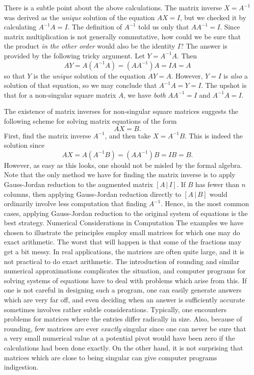 There is a subtle point about the above calculations.   The
matrix inverse  $X = A^{-1}$ was derived as the {\it unique\/}
solution of the equation $AX = I$, but we checked it by calculating
$A^{-1}A = I$.   The definition of $A^{-1}$ told us only that
$AA^{-1} = I$.   Since matrix multiplication is not generally
commutative, how could we be sure that the product {\it in the
other order\/} would also be the identity $I$?  The answer is
provided by the following tricky argument.   Let $Y = A^{-1}A$.
Then
$$
   AY = A(A^{-1}A) = (AA^{-1})A = IA = A
$$
so that $Y$ is the {\it unique\/} solution of the equation
$AY = A$.  However, $Y=I$ is {\it also\/} a solution of
that equation, so we may conclude that $A^{-1}A = Y = I$.
The upshot is that for a non-singular square matrix $A$, we have
{\it both\/}  $AA^{-1} = I$ and $A^{-1}A = I$.

The existence of matrix inverses for non-singular square matrices
suggests the following scheme for solving matrix equations of the
form
$$
  AX = B.
$$
First, find the matrix inverse $A^{-1}$, and then take $X = A^{-1}B$.
This is indeed the solution since
$$
  AX = A(A^{-1}B) = (AA^{-1})B = IB = B.
$$
However, as easy as this looks, one should not be misled by the formal
algebra.   Note that the only method we have for finding the
matrix inverse is to apply Gauss-Jordan reduction to the augmented
matrix $[A \,|\, I]$.   If $B$ has fewer than $n$ columns,
then applying Gauss-Jordan reduction directly to $[A\,|\, B]$
would ordinarily involve less computation that finding
$A^{-1}$.  Hence, in the most common cases, applying Gauss-Jordan
reduction  to the original system of equations is the best strategy.   
\medskip
\subhead Numerical Considerations in Computation \endsubhead
The examples we have chosen to illustrate the principles employ
small matrices for which one may do exact arithmetic.  The worst
that will happen is that some of the fractions may get a bit
messy.  In real applications, the matrices are often quite
large, and it is not practical to do exact arithmetic.   The
introduction of rounding and similar numerical approximations
complicates the situation, and computer programs for solving
systems of equations have to deal with problems which arise
from this.  If one is not careful in designing such a program,
one can easily generate answers which are very far off, and even deciding
when an answer is sufficiently accurate sometimes involves rather
subtle considerations.   Typically, one encounters problems
for matrices where the entries differ radically in size.  Also,
because of rounding, few matrices are ever {\it exactly\/}
singular since one can never be sure that a very small numerical
value at a potential pivot would have been  zero if the
calculations had been done exactly.  On the other hand, it
is not surprising that matrices which are close to being singular
can give computer programs indigestion.

